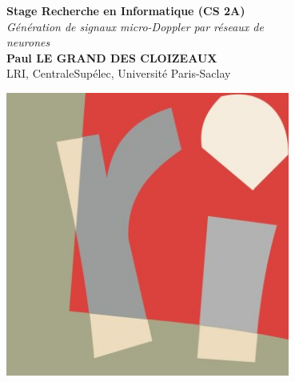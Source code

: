 \documentclass[a0,portrait]{a0poster}
\begin{document}
\large
\sffamily 


\begin{minipage}[b]{0.75\linewidth}
\veryHuge \color{NavyBlue} \textbf{Stage Recherche en Informatique (CS 2A)} \color{Black}\\
\Huge\textit{ Génération de signaux micro-Doppler par réseaux de \\neurones }\\[18mm]
\huge \textbf{Paul LE GRAND DES CLOIZEAUX}\\[0.0cm] 
\huge LRI, CentraleSupélec, Université Paris-Saclay
\end{minipage}
%
\begin{minipage}[b]{0.23\linewidth}
\begin{flushright}
\includegraphics[width=0.7\textwidth]{logo_lri.jpg}
\end{flushright}
\end{minipage}


\end{document}

